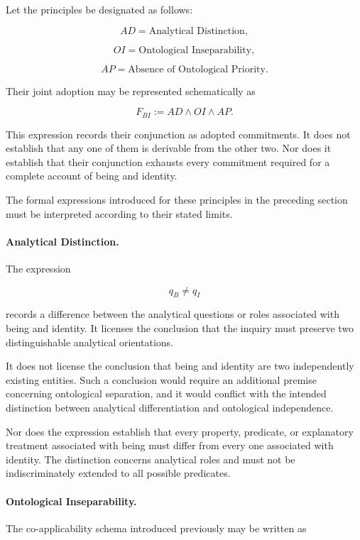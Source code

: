 Let the principles be designated as follows:

\[
    AD = \text{Analytical Distinction},
\]

\[
    OI = \text{Ontological Inseparability},
\]

\[
    AP = \text{Absence of Ontological Priority}.
\]

Their joint adoption may be represented schematically as

\[
    F_{BI} := AD \land OI \land AP.
\]

This expression records their conjunction as adopted commitments.
It does not establish that any one of them is derivable from the
other two. Nor does it establish that their conjunction exhausts
every commitment required for a complete account of being and
identity.

The formal expressions introduced for these principles in the
preceding section must be interpreted according to their stated
limits.

\paragraph{Analytical Distinction.}

The expression

\[
    q_B \neq q_I
\]

records a difference between the analytical questions or roles
associated with being and identity. It licenses the conclusion
that the inquiry must preserve two distinguishable analytical
orientations.

It does not license the conclusion that being and identity are
two independently existing entities. Such a conclusion would
require an additional premise concerning ontological separation,
and it would conflict with the intended distinction between
analytical differentiation and ontological independence.

Nor does the expression establish that every property, predicate,
or explanatory treatment associated with being must differ from
every one associated with identity. The distinction concerns
analytical roles and must not be indiscriminately extended to
all possible predicates.

\paragraph{Ontological Inseparability.}

The co-applicability schema introduced previously may be written
as

